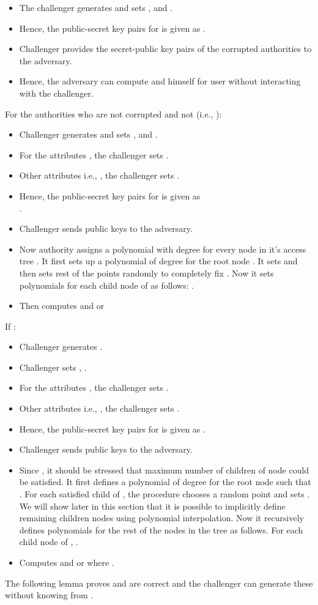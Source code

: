 \documentclass[10pt,journal]{IEEEtran}
\begin{document}
 \begin{itemize}
   \item The challenger generates  and sets ,  and .
   \item Hence, the public-secret key pairs for  is given as .
   \item Challenger provides the secret-public key pairs of the corrupted authorities to the adversary.
   \item Hence, the adversary can compute  and  himself for user  without interacting with the challenger.
 \end{itemize}
 For the authorities who are not corrupted and not  (i.e., ):

  \begin{itemize}
    \item Challenger generates  and sets , and .
    \item For the attributes , the challenger sets .
    \item Other attributes i.e., , the challenger sets .
    \item Hence, the public-secret key pairs for  is given as\\ .
    \item Challenger sends public keys  to the adversary.
    \item Now authority  assigns a polynomial   with degree  for every node in it's access tree . It first sets up a polynomial  of degree  for the root node . It sets  and then sets rest of the points randomly to completely fix . Now it sets polynomials for each child node   of  as follows: .
    \item Then computes  and  or 
  \end{itemize}
 If :
  \begin{itemize}
    \item Challenger generates .
     \item Challenger sets , .
     \item For the attributes , the challenger sets .
    \item Other attributes i.e., , the challenger sets .
    \item Hence, the public-secret key pairs for  is given as .
    \item Challenger sends public keys  to the adversary.

    \item Since , it should be stressed that maximum  number of  children of node  could be satisfied. It first defines a polynomial  of degree  for the root node  such that .  For each satisfied child   of , the procedure chooses a random point  and sets . We will show later in this section that it is possible to implicitly define remaining children nodes using polynomial interpolation.  Now it recursively defines polynomials for the rest of the nodes in the tree as follows. For each child node  of , .
    \item Computes  and  or
         where .
  \end{itemize}
The following lemma proves  and  are correct and the challenger can generate these without knowing  from .\\
\end{document}
